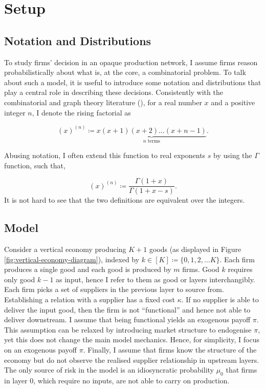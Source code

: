 \documentclass[../../main.tex]{subfiles}
\begin{document}
\section{Setup}

\subsection{Notation and Distributions}

To study firms' decision in an opaque production network, I assume firms reason probabilistically about what is, at the core, a combinatorial problem. To talk about such a model, it is useful to introduce some notation and distributions that play a central role in describing these decisions. Consistently with the combinatorial and graph theory literature (\cite{harris_combinatorics_2008}), for a real number $x$ and a positive integer $n$, I  denote the rising factorial as

\begin{equation}
  (x)^{(n)} \coloneqq \underbrace{x(x + 1)(x + 2)\ldots(x + n - 1)}_{n \text{ terms}}.
\end{equation}

Abusing notation, I  often extend this function to real exponents $s$ by using the $\Gamma$ function, such that,

\begin{equation}
  (x)^{(n)} \coloneqq \frac{\Gamma(1 + x)}{\Gamma(1 + x - s)}.
\end{equation} It is not hard to see that the two definitions are equivalent over the integers.


\subsection{Model}

Consider a vertical economy producing $K + 1$ goods (as displayed in Figure \ref{fig:vertical-economy-diagram}), indexed by $k \in [K] \coloneqq \{ 0, 1, 2, \ldots K \}$. Each firm produces a single good and each good is produced by $m$ firms. Good $k$ requires only good $k - 1$ as input, hence I  refer to them as good or layers interchangibly. Each firm picks a set of suppliers in the previous layer to source from. Establishing a relation with a supplier has a fixed cost $\kappa$. If no supplier is able to deliver the input good, then the firm is not ``functional'' and hence not able to deliver downstream. I assume that being functional yields an exogenous payoff $\pi$. This assumption can be relaxed by introducing market structure to endogenise $\pi$, yet this does not change the main model mechanics. Hence, for simplicity, I  focus on an exogenous payoff $\pi$. Finally, I assume that firms know the structure of the economy but do not observe the realised supplier relationship in upstream layers. The only source of risk in the model is an idiosyncratic probability $\mu_0$ that firms in layer $0$, which require no inputs, are not able to carry on production.
\end{document}
